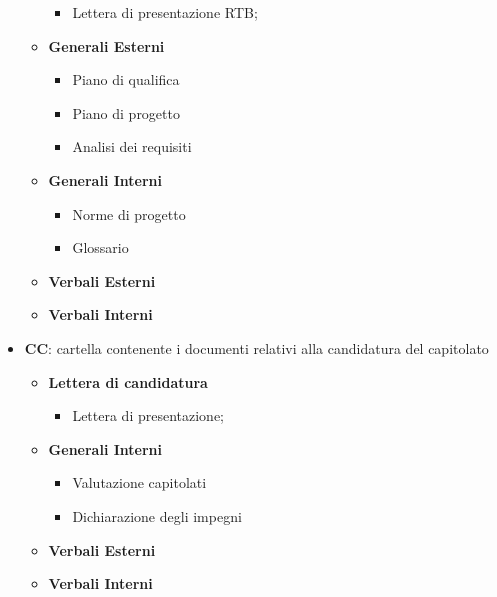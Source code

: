\begin{itemize}
\begin{itemize}
\begin{itemize}
                                \item Lettera di presentazione RTB;
                        \end{itemize}
                        \item \textbf{Generali Esterni}
                        \begin{itemize}
                                \item Piano di qualifica
                                \item Piano di progetto
                                \item Analisi dei requisiti
                        \end{itemize}
                        \item \textbf{Generali Interni}
                        \begin{itemize}
                                \item Norme di progetto
                                \item Glossario
                        \end{itemize}
                        \item \textbf{Verbali Esterni}
                        \item \textbf{Verbali Interni}
                \end{itemize}

                \item \textbf{CC}: cartella contenente i documenti relativi alla candidatura del capitolato
                \begin{itemize}
                        \item \textbf{Lettera di candidatura}
                        \begin{itemize}
                                \item Lettera di presentazione;
                        \end{itemize}
                        \item \textbf{Generali Interni}
                        \begin{itemize}
                                \item Valutazione capitolati
                                \item Dichiarazione degli impegni
                        \end{itemize}
                        \item \textbf{Verbali Esterni}
                        \item \textbf{Verbali Interni}
                \end{itemize}
        \end{itemize}

